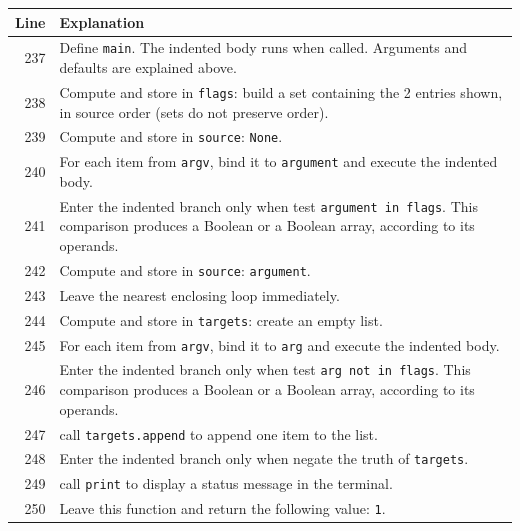 \documentclass[11pt,a4paper]{book}
\begin{document}
\begin{longtable}{r p{}}

\textbf{Line} & \textbf{Explanation} \\ \hline \endhead

237 & Define \texttt{main}. The indented body runs when called. Arguments and defaults are explained above. \\

238 & Compute and store in \texttt{flags}: build a set containing the 2 entries shown, in source order (sets do not preserve order).  \\

239 & Compute and store in \texttt{source}: \texttt{None}.  \\

240 & For each item from \texttt{argv}, bind it to \texttt{argument} and execute the indented body. \\

241 & Enter the indented branch only when test \texttt{argument in flags}. This comparison produces a Boolean or a Boolean array, according to its operands. \\

242 & Compute and store in \texttt{source}: \texttt{argument}.  \\

243 & Leave the nearest enclosing loop immediately. \\

244 & Compute and store in \texttt{targets}: create an empty list.  \\

245 & For each item from \texttt{argv}, bind it to \texttt{arg} and execute the indented body. \\

246 & Enter the indented branch only when test \texttt{arg not in flags}. This comparison produces a Boolean or a Boolean array, according to its operands. \\

247 & call \texttt{targets.append} to append one item to the list. \\

248 & Enter the indented branch only when negate the truth of \texttt{targets}. \\

249 & call \texttt{print} to display a status message in the terminal. \\

250 & Leave this function and return the following value: \texttt{1}. \\


\end{longtable}
\end{document}
